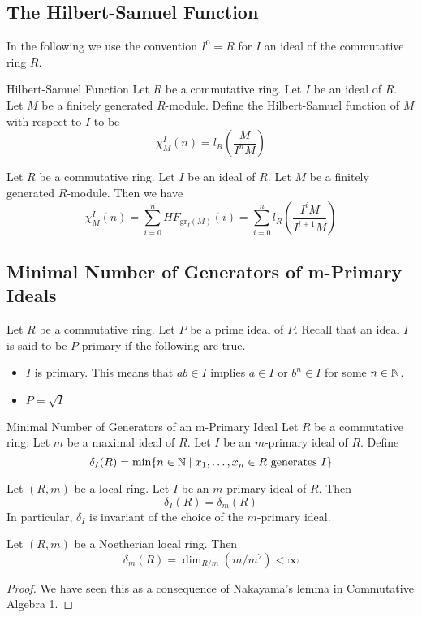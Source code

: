 \documentclass[a4paper]{article}
\begin{document}
\subsection{The Hilbert-Samuel Function}
In the following we use the convention $I^0=R$ for $I$ an ideal of the commutative ring $R$. 

\begin{defn}{Hilbert-Samuel Function}{} Let $R$ be a commutative ring. Let $I$ be an ideal of $R$. Let $M$ be a finitely generated $R$-module. Define the Hilbert-Samuel function of $M$ with respect to $I$ to be $$\chi_M^I(n)=l_R\left(\frac{M}{I^nM}\right)$$
\end{defn}

\begin{prp}{}{} Let $R$ be a commutative ring. Let $I$ be an ideal of $R$. Let $M$ be a finitely generated $R$-module. Then we have $$\chi_M^I(n)=\sum_{i=0}^nHF_{\text{gr}_I(M)}(i)=\sum_{i=0}^nl_R\left(\frac{I^iM}{I^{i+1}M}\right)$$
\end{prp}

\subsection{Minimal Number of Generators of m-Primary Ideals}
Let $R$ be a commutative ring. Let $P$ be a prime ideal of $P$. Recall that an ideal $I$ is said to be $P$-primary if the following are true. 
\begin{itemize}
\item $I$ is primary. This means that $ab\in I$ implies $a\in I$ or $b^n\in I$ for some $n\in\mathbb{N}$. 
\item $P=\sqrt{I}$
\end{itemize}

\begin{defn}{Minimal Number of Generators of an m-Primary Ideal}{} Let $R$ be a commutative ring. Let $m$ be a maximal ideal of $R$. Let $I$ be an $m$-primary ideal of $R$. Define $$\delta_I(R)=\min\{n\in\mathbb{N}\;|\;x_1,\dots,x_n\in R\text{ generates }I\}$$
\end{defn}

\begin{prp}{}{} Let $(R,m)$ be a local ring. Let $I$ be an $m$-primary ideal of $R$. Then $$\delta_I(R)=\delta_m(R)$$ In particular, $\delta_I$ is invariant of the choice of the $m$-primary ideal. 
\end{prp}

\begin{prp}{}{} Let $(R,m)$ be a Noetherian local ring. Then $$\delta_m(R)=\dim_{R/m}(m/m^2)<\infty$$ \tcbline
\begin{proof}
We have seen this as a consequence of Nakayama's lemma in Commutative Algebra 1. 
\end{proof}
\end{prp}
\end{document}
